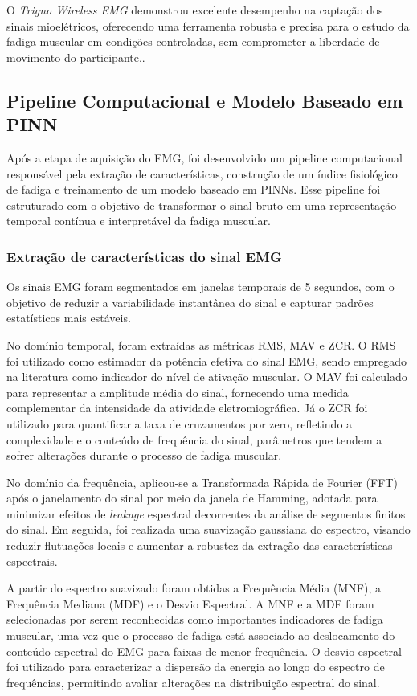 \documentclass[symbols]{fei}
\begin{document}
O \textit{Trigno Wireless EMG} demonstrou excelente desempenho na captação dos sinais mioelétricos, oferecendo uma ferramenta 
robusta e precisa para o estudo da fadiga muscular em condições controladas, sem comprometer a liberdade de movimento do participante..

\subsection{Pipeline Computacional e Modelo Baseado em PINN}

Após a etapa de aquisição do EMG, foi desenvolvido um pipeline computacional responsável pela extração de 
características, construção de um índice fisiológico de fadiga e treinamento de um modelo baseado em PINNs. Esse pipeline foi estruturado com o 
objetivo de transformar o sinal bruto em uma representação temporal contínua e interpretável da fadiga muscular.

\subsubsection{Extração de características do sinal EMG}

Os sinais EMG foram segmentados em janelas temporais de 5 segundos, com o objetivo de reduzir a 
variabilidade instantânea do sinal e capturar padrões estatísticos mais estáveis. 

No domínio temporal, foram extraídas as métricas RMS, MAV e ZCR. 
O RMS foi utilizado como estimador da potência efetiva do sinal EMG, sendo empregado na literatura como indicador do nível de ativação muscular. O MAV 
foi calculado para representar a amplitude média do sinal, fornecendo uma medida complementar da intensidade da atividade 
eletromiográfica. Já o ZCR foi utilizado para quantificar a taxa de cruzamentos por zero, refletindo a complexidade e o 
conteúdo de frequência do sinal, parâmetros que tendem a sofrer alterações durante o processo de fadiga muscular.

No domínio da frequência, aplicou-se a Transformada Rápida de Fourier (FFT) após o janelamento do sinal por meio da janela de Hamming, 
adotada para minimizar efeitos de \textit{leakage} espectral decorrentes da análise de segmentos finitos do sinal. Em seguida, foi realizada uma 
suavização gaussiana do espectro, visando reduzir flutuações locais e aumentar a robustez da extração das características espectrais.

A partir do espectro suavizado foram obtidas a Frequência Média (MNF), a Frequência Mediana (MDF) e o Desvio Espectral. 
A MNF e a MDF foram selecionadas por serem reconhecidas como importantes indicadores de fadiga muscular, uma vez que o 
processo de fadiga está associado ao deslocamento do conteúdo espectral do 
EMG para faixas de menor frequência. O desvio espectral foi 
utilizado para caracterizar a dispersão da energia ao 
longo do espectro de frequências, permitindo avaliar alterações na distribuição espectral do sinal.
\end{document}
